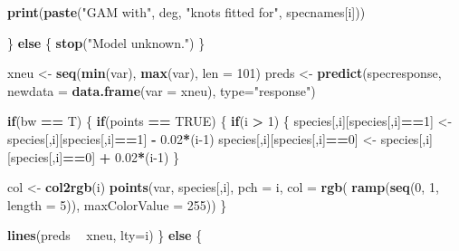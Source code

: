 \documentclass[]{article}
\newenvironment{Shaded}{\begin{snugshade}}{\end{snugshade}}
\newcommand{\ControlFlowTok}[1]{\textcolor[rgb]{0.13,0.29,0.53}{\textbf{#1}}}
\newcommand{\DataTypeTok}[1]{\textcolor[rgb]{0.13,0.29,0.53}{#1}}
\newcommand{\DecValTok}[1]{\textcolor[rgb]{0.00,0.00,0.81}{#1}}
\newcommand{\FloatTok}[1]{\textcolor[rgb]{0.00,0.00,0.81}{#1}}
\newcommand{\KeywordTok}[1]{\textcolor[rgb]{0.13,0.29,0.53}{\textbf{#1}}}
\newcommand{\NormalTok}[1]{#1}
\newcommand{\OperatorTok}[1]{\textcolor[rgb]{0.81,0.36,0.00}{\textbf{#1}}}
\newcommand{\OtherTok}[1]{\textcolor[rgb]{0.56,0.35,0.01}{#1}}
\newcommand{\StringTok}[1]{\textcolor[rgb]{0.31,0.60,0.02}{#1}}
\begin{document}
\begin{Shaded}
\begin{Highlighting}[]
        \KeywordTok{print}\NormalTok{(}\KeywordTok{paste}\NormalTok{(}\StringTok{"GAM with"}\NormalTok{, deg, }\StringTok{"knots fitted for"}\NormalTok{, specnames[i]))}
        
\NormalTok{      \} }\ControlFlowTok{else}\NormalTok{ \{}
        \KeywordTok{stop}\NormalTok{(}\StringTok{"Model unknown."}\NormalTok{)}
\NormalTok{      \}}
      
\NormalTok{      xneu <-}\StringTok{ }\KeywordTok{seq}\NormalTok{(}\KeywordTok{min}\NormalTok{(var), }\KeywordTok{max}\NormalTok{(var), }\DataTypeTok{len =} \DecValTok{101}\NormalTok{)}
\NormalTok{      preds <-}\StringTok{ }\KeywordTok{predict}\NormalTok{(specresponse, }\DataTypeTok{newdata =} \KeywordTok{data.frame}\NormalTok{(}\DataTypeTok{var =}\NormalTok{ xneu),}
                       \DataTypeTok{type=}\StringTok{"response"}\NormalTok{)}
      
      \ControlFlowTok{if}\NormalTok{(bw }\OperatorTok{==}\StringTok{ }\NormalTok{T) \{}
        \ControlFlowTok{if}\NormalTok{(points }\OperatorTok{==}\StringTok{ }\OtherTok{TRUE}\NormalTok{) \{}
          \ControlFlowTok{if}\NormalTok{(i }\OperatorTok{>}\StringTok{ }\DecValTok{1}\NormalTok{) \{}
\NormalTok{            species[,i][species[,i]}\OperatorTok{==}\DecValTok{1}\NormalTok{] <-}\StringTok{ }\NormalTok{species[,i][species[,i]}\OperatorTok{==}\DecValTok{1}\NormalTok{] }\OperatorTok{-}\StringTok{ }\FloatTok{0.02}\OperatorTok{*}\NormalTok{(i}\DecValTok{-1}\NormalTok{)}
\NormalTok{            species[,i][species[,i]}\OperatorTok{==}\DecValTok{0}\NormalTok{] <-}\StringTok{ }\NormalTok{species[,i][species[,i]}\OperatorTok{==}\DecValTok{0}\NormalTok{] }\OperatorTok{+}\StringTok{ }\FloatTok{0.02}\OperatorTok{*}\NormalTok{(i}\DecValTok{-1}\NormalTok{)}
\NormalTok{          \}}
          
\NormalTok{          col <-}\StringTok{ }\KeywordTok{col2rgb}\NormalTok{(i)}
          \KeywordTok{points}\NormalTok{(var, species[,i], }\DataTypeTok{pch =}\NormalTok{ i,}
                 \DataTypeTok{col =} \KeywordTok{rgb}\NormalTok{( }\KeywordTok{ramp}\NormalTok{(}\KeywordTok{seq}\NormalTok{(}\DecValTok{0}\NormalTok{, }\DecValTok{1}\NormalTok{, }\DataTypeTok{length =} \DecValTok{5}\NormalTok{)), }\DataTypeTok{maxColorValue =} \DecValTok{255}\NormalTok{))}
\NormalTok{        \}}
        
        \KeywordTok{lines}\NormalTok{(preds }\OperatorTok{~}\StringTok{ }\NormalTok{xneu, }\DataTypeTok{lty=}\NormalTok{i)}
\NormalTok{      \} }\ControlFlowTok{else}\NormalTok{ \{}
        

\end{Highlighting}
\end{Shaded}
\end{document}
